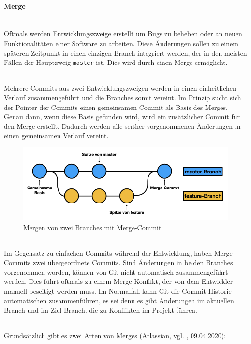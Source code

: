 \paragraph{Merge}\mbox{}\\
Oftmals werden Entwicklungszweige erstellt um Bugs zu beheben oder an neuen Funktionalitäten einer Software zu arbeiten. Diese Änderungen sollen zu einem späteren Zeitpunkt in einen einzigen Branch integriert werden, der in den meisten Fällen der Hauptzweig \texttt{master} ist. Dies wird durch einen Merge ermöglicht.

 \mbox{}\\
Mehrere Commits aus zwei Entwicklungszweigen werden in einen einheitlichen Verlauf zusammengeführt und die Branches somit vereint. Im Prinzip sucht sich der Pointer der Commits einen gemeinsamen Commit als Basis des Merges. Genau dann, wenn diese Basis gefunden wird, wird ein zusätzlicher Commit für den Merge erstellt. Dadurch werden alle seither vorgenommenen Änderungen in einen gemeinsamen Verlauf vereint.

\begin{figure}[H]
\begin{center}
	\includegraphics[scale=.8]{images/git-merge.png}
\end{center}
	\caption{Mergen von zwei Branches mit Merge-Commit}
\end{figure}

 \mbox{}\\
Im Gegensatz zu einfachen Commits während der Entwicklung, haben Merge-Commits zwei übergeordnete Commits. Sind Änderungen in beiden Branches vorgenommen worden, können von Git nicht automatisch zusammengeführt werden. Dies führt oftmals zu einem Merge-Konflikt, der von dem Entwickler manuell beseitigt werden muss. Im Normalfall kann Git die Commit-Historie automatischen zusammenführen, es sei denn es gibt Änderungen im aktuellen Branch und im Ziel-Branch, die zu Konflikten im Projekt führen.

 \mbox{}\\
Grundsätzlich gibt es zwei Arten von Merges (Atlassian, vgl. \cite{atlassian_git_merge_2021}, 09.04.2020):

